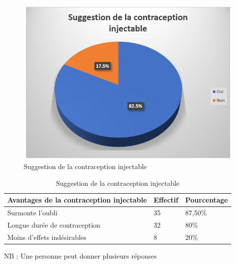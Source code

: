 \begin{figure}[H]
  \centering
  \includegraphics{Images/fig_49.png}
  \caption{Suggestion de la contraception injectable}
  
\end{figure}

\begin{table}[H]
  \centering
  \renewcommand{\arraystretch}{1.5}
  \caption{Suggestion de la contraception injectable}
  \begin{spacing}{1.5} %
  \begin{tabularx}{\textwidth}{|p{8cm}|X|X|}
      \hline
      \rowcolor{customcolor}
      \textbf{\color{white}Avantages de la contraception  \newline injectable} & \textbf{\color{white}Effectif} & \textbf{\color{white}Pourcentage}  \\
      \hline
      Surmonte l’oubli & 35 & 87,50\% \\
      \hline
      Longue durée de contraception & 32 & 80\% \\
      \hline
      Moins d’effets indésirables & 8 & 20\% \\
      \hline
  \end{tabularx}
\end{spacing}

\end{table}

\noindent NB : Une personne peut donner plusieurs réponses

\vspace{2em}

